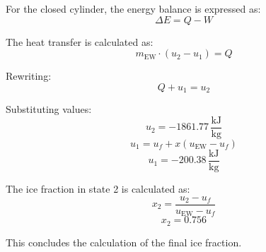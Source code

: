 For the closed cylinder, the energy balance is expressed as:  
\[
\Delta E = Q - W
\]  

The heat transfer is calculated as:  
\[
m_{\text{EW}} \cdot (u_2 - u_1) = Q
\]  

Rewriting:  
\[
Q + u_1 = u_2
\]  

Substituting values:  
\[
u_2 = -1861.77 \, \frac{\text{kJ}}{\text{kg}}
\]  
\[
u_1 = u_f + x(u_{\text{EW}} - u_f)
\]  
\[
u_1 = -200.38 \, \frac{\text{kJ}}{\text{kg}}
\]  

The ice fraction in state 2 is calculated as:  
\[
x_2 = \frac{u_2 - u_f}{u_{\text{EW}} - u_f}
\]  
\[
x_2 = 0.756
\]  

This concludes the calculation of the final ice fraction.